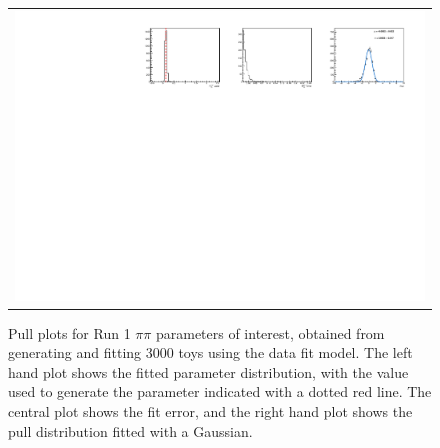 \begin{figure}
\begin{tabular}{c}
\includegraphics[width=\textwidth]{ANA_resources/Plots/Data_fit/FitterBias//R_ds_pipi_run1.pdf} \\
  \end{tabular}
  \caption{Pull plots for Run 1 $\pi\pi$ parameters of interest, obtained from generating and fitting 3000 toys using the data fit model. The left hand plot shows the fitted parameter distribution, with the value used to generate the parameter indicated with a dotted red line. The central plot shows the fit error, and the right hand plot shows the pull distribution fitted with a Gaussian.}
\label{fig:pipi_run1_pulls}
\end{figure}
